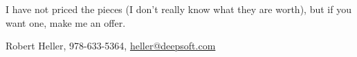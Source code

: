 \documentclass[12pt]{article}
\begin{document}
I have not priced the pieces (I don't really know what they are worth), but if 
you want one, make me an offer.

Robert Heller, 978-633-5364, \url{heller@deepsoft.com}



%
%
%

%
%
%
%
\end{document}
